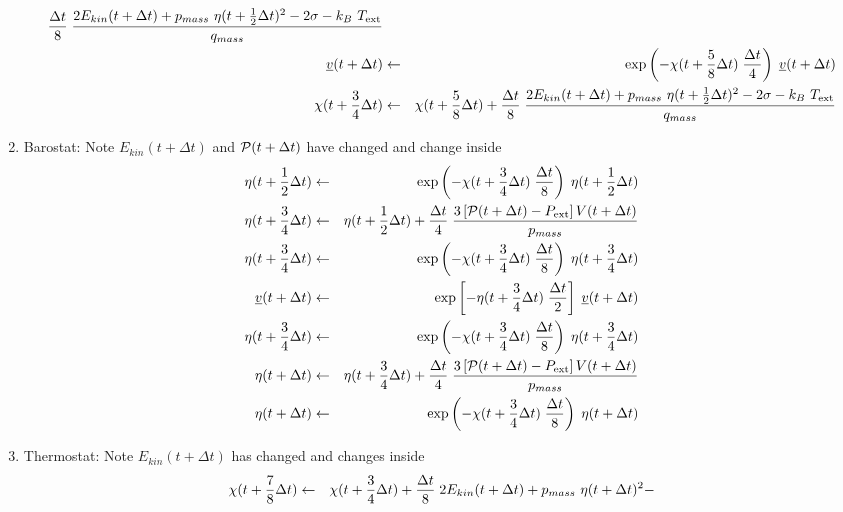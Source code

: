 \begin{enumerate}
\begin{eqnarray}
{\Delta t \over 8} \; {{2 E_{kin}(t + \Delta t) + p_{mass}~\eta (t + {1 \over 2} \Delta t)^{2} -
2 \sigma - k_{B}~T_{\rm ext}} \over q_{mass}} \nonumber \\
\mbox{$\underline{v}$}(t + \Delta t) &\leftarrow& \exp \left(-\chi (t + {5 \over 8} \Delta t) \;
{\Delta t \over 4} \right) \; \mbox{$\underline{v}$}(t + \Delta t) \\
\chi (t + {3 \over 4} \Delta t) &\leftarrow& \chi (t + {5 \over 8} \Delta t) +
{\Delta t \over 8} \; {{2 E_{kin}(t + \Delta t) + p_{mass}~\eta (t + {1 \over 2} \Delta t)^{2} -
2 \sigma - k_{B}~T_{\rm ext}} \over q_{mass}} \nonumber
\end{eqnarray}
\item Barostat: Note $E_{kin}(t + \Delta t)$ and ${\cal P}(t + \Delta t)$
have changed and change inside
\begin{eqnarray}
\eta (t + {1 \over 2} \Delta t) &\leftarrow& \exp \left( -\chi (t + {3 \over 4} \Delta t) \;
{\Delta t \over 8} \right) \; \eta (t + {1 \over 2} \Delta t) \nonumber \\
\eta (t + {3 \over 4} \Delta t) &\leftarrow& \eta (t + {1 \over 2} \Delta t) + {\Delta t \over 4} \;
{3 \left[ {\cal P}(t + \Delta t) - P_{\rm ext} \right] V(t + \Delta t) \over p_{mass}} \nonumber \\
\eta (t + {3 \over 4} \Delta t) &\leftarrow& \exp \left( -\chi (t + {3 \over 4} \Delta t) \;
{\Delta t \over 8} \right) \; \eta (t + {3 \over 4} \Delta t) \nonumber \\
\mbox{$\underline{v}$}(t + \Delta t) &\leftarrow& \exp \left[ -\eta (t + {3 \over 4} \Delta t) \;
{\Delta t \over 2} \right] \; \mbox{$\underline{v}$}(t + \Delta t) \\
\eta (t + {3 \over 4} \Delta t) &\leftarrow& \exp \left( -\chi (t + {3 \over 4} \Delta t) \;
{\Delta t \over 8} \right) \; \eta (t + {3 \over 4} \Delta t) \nonumber \\
\eta (t + \Delta t) &\leftarrow& \eta (t + {3 \over 4} \Delta t) + {\Delta t \over 4} \;
{3 \left[ {\cal P}(t + \Delta t) - P_{\rm ext} \right] V(t + \Delta t) \over p_{mass}} \nonumber \\
\eta (t + \Delta t) &\leftarrow& \exp \left( -\chi (t + {3 \over 4} \Delta t) \;
{\Delta t \over 8} \right) \; \eta (t + \Delta t) \nonumber
\end{eqnarray}
\item Thermostat: Note $E_{kin}(t + \Delta t)$ has changed and changes inside
\begin{eqnarray}
\chi (t + {7 \over 8} \Delta t) &\leftarrow& \chi (t + {3 \over 4} \Delta t) +
{\Delta t \over 8} \; {{2 E_{kin}(t + \Delta t) + p_{mass}~\eta (t + \Delta t)^{2} -
}}
\end{eqnarray}
\end{enumerate}
